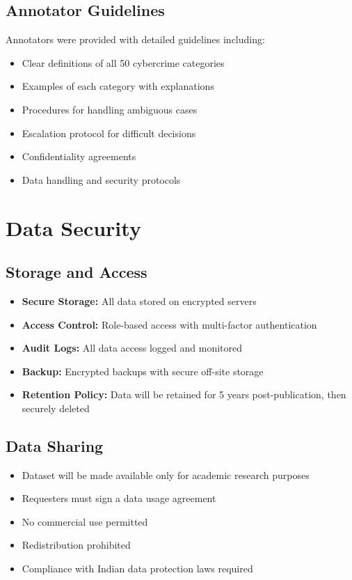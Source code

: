 \documentclass[10pt,a4paper]{article}
\begin{document}
\subsection{Annotator Guidelines}
Annotators were provided with detailed guidelines including:
\begin{itemize}[leftmargin=*]
\item Clear definitions of all 50 cybercrime categories
\item Examples of each category with explanations
\item Procedures for handling ambiguous cases
\item Escalation protocol for difficult decisions
\item Confidentiality agreements
\item Data handling and security protocols
\end{itemize}

\section{Data Security}

\subsection{Storage and Access}
\begin{itemize}[leftmargin=*]
\item \textbf{Secure Storage:} All data stored on encrypted servers
\item \textbf{Access Control:} Role-based access with multi-factor authentication
\item \textbf{Audit Logs:} All data access logged and monitored
\item \textbf{Backup:} Encrypted backups with secure off-site storage
\item \textbf{Retention Policy:} Data will be retained for 5 years post-publication, then securely deleted
\end{itemize}

\subsection{Data Sharing}
\begin{itemize}[leftmargin=*]
\item Dataset will be made available only for academic research purposes
\item Requesters must sign a data usage agreement
\item No commercial use permitted
\item Redistribution prohibited
\item Compliance with Indian data protection laws required
\end{itemize}
\end{document}
